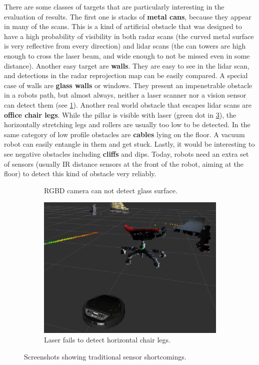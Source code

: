 There are some classes of targets that are particularly interesting in the evaluation of results. The first one is stacks of \textbf{metal cans}, because they appear in many of the scans. This is a kind of artificial obstacle that was designed to have a high probability of visibility in both radar scans (the curved metal surface is very reflective from every direction) and lidar scans (the can towers are high enough to cross the laser beam, and wide enough to not be missed even in some distance). Another easy target are \textbf{walls}. They are easy to see in the lidar scan, and detections in the radar reprojection map can be easily compared. A special case of walls are \textbf{glass walls} or windows. They present an impenetrable obstacle in a robots path, but almost always, neither a laser scanner nor a vision sensor can detect them (see \cref{fig:rgbd_glasswall2}). Another real world obstacle that escapes lidar scans are \textbf{office chair legs}. While the pillar is visible with laser (green dot in \cref{fig:lidar_rgbd2}), the horizontally stretching legs and rollers are usually too low to be detected. In the same category of low profile obstacles are \textbf{cables} lying on the floor. A vacuum robot can easily entangle in them and get stuck. Lastly, it would be interesting to see negative obstacles including \textbf{cliffs} and dips. Today, robots need an extra set of sensors (usually IR distance sensors at the front of the robot, aiming at the floor) to detect this kind of obstacle very reliably.

\begin{figure}
  \begin{subfigure}[t]{.485\textwidth}
      \centering
      \def\svgwidth{\linewidth}
      
      \caption{RGBD camera can not detect glass surface.}
      \label{fig:rgbd_glasswall2}
  \end{subfigure}%
  \hfill%
  \begin{subfigure}[t]{.485\textwidth}
      \centering
      \includegraphics[max width=\textwidth]{gfx/screenshots/chair_laser_vs_rgbd}
      \caption{Laser fails to detect horizontal chair legs.}
      \label{fig:lidar_rgbd2}
  \end{subfigure}%
  \caption{Screenshots showing traditional sensor shortcomings.}
\end{figure}


